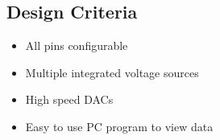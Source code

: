 \subsection{Design Criteria}
\begin{itemize}
\item All pins configurable
\item Multiple integrated voltage sources
\item High speed DACs
\item Easy to use PC program to view data
\end{itemize}